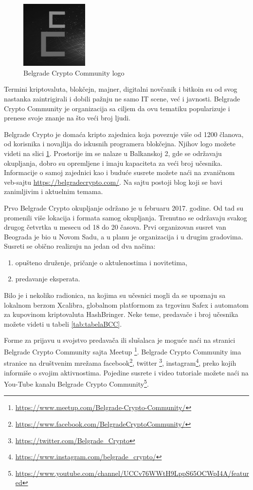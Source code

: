 \documentclass[a4paper]{article}
\begin{document}
{\begin{figure}[h]
  \centering
  \includegraphics[width=0.3\textwidth]{bcc_logo.png}
  \caption{Belgrade Crypto Community logo}
  \label{fig:bgdcclogo}
\end{figure}

Termini  kriptovaluta, blokčejn, majner, digitalni novčanik i bitkoin su od svog nastanka zaintrigirali i dobili pažnju ne samo IT scene, već i javnosti. Belgrade Crypto Community je organizacija sa ciljem da ovu tematiku popularizuje i prenese svoje znanje na što veći broj ljudi.

Belgrade Crypto je domaća kripto zajednica koja povezuje više od 1200 članova, od korisnika i novajlija do iskusnih programera blokčejna. Njihov logo možete videti na slici \ref{fig:bgdcclogo}. Prostorije im se nalaze u Balkanskoj 2, gde se održavaju okupljanja, dobro su opremljene i imaju kapaciteta za veći broj učesnika. Informacije o samoj zajednici kao i buduće susrete možete naći na zvaničnom veb-sajtu \url{https://belgradecrypto.com/}. Na sajtu postoji blog koji se bavi zanimljivim i aktuelnim temama.\cite{aboutBCC}

Prvo Belgrade Crypto okupljanje održano je u februaru 2017. godine. Od tad su promenili više lokacija i formata samog okupljanja. Trenutno se održavaju svakog drugog četvrtka u mesecu od 18 do 20 časova. Prvi organizovan susret van Beograda je bio u Novom Sadu, a u planu je organizacija i u drugim gradovima. Susreti se obično realizuju na jedan od dva načina:
\begin{enumerate}
\item  opušteno druženje, pričanje o aktulenostima i novitetima,
\item predavanje eksperata.
\end{enumerate}
Bilo je i nekoliko radionica, na kojima su učesnici mogli  da se upoznaju sa lokalnom berzom Xcalibra, globalnom platformom za trgovinu Safex i automatom za kupovinom kriptovaluta HashBringer. Neke teme, predavače i broj učesnika možete videti u tabeli \ref{tab:tabelaBCC}.

Forme za prijavu u svojstvo predavača ili slušalaca je moguće naći na stranici Belgrade Crypto Community sajta Meetup \footnote{\url{https://www.meetup.com/Belgrade-Crypto-Community/}}. Belgrade Crypto Community ima stranice na društvenim mrežama facebook\footnote{\url{https://www.facebook.com/BelgradeCryptoCommunity/}}, twitter \footnote{\url{https://twitter.com/Belgrade_Crypto}}, instagram\footnote{\url{https://www.instagram.com/belgrade_crypto/}}, preko kojih informiše o svojim aktivnostima. Pojedine susrete i video tutoriale možete naći na You-Tube kanalu Belgrade Crypto Community\footnote{\url{https://www.youtube.com/channel/UCCv76WWtH9LppS65OCWpI4A/featured}}.

}
\end{document}
